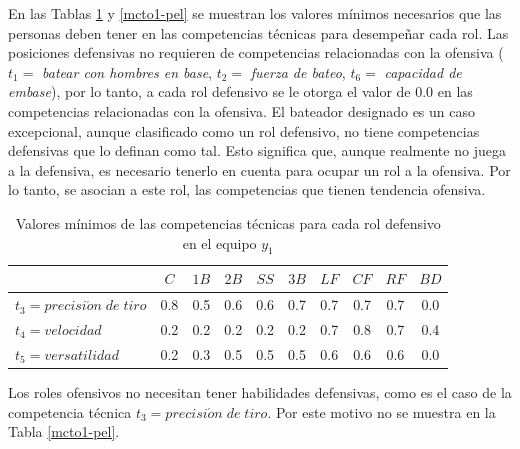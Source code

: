  
En las Tablas \ref{mctd1-pel} y \ref{mcto1-pel} se muestran los valores mínimos necesarios que las personas deben tener en las competencias técnicas para desempeñar cada rol. Las posiciones defensivas no requieren de competencias relacionadas con la ofensiva ($t_1=$ \textit{batear con hombres en base}, $t_2=$ \textit{fuerza de bateo}, $t_6=$ \textit{capacidad de embase}), por lo tanto, a cada rol defensivo se le otorga el valor de 0.0 en las competencias relacionadas con la ofensiva. El bateador designado es un caso excepcional, aunque clasificado como un rol defensivo, no tiene competencias defensivas que lo definan como tal. Esto significa que, aunque realmente no juega a la defensiva, es necesario tenerlo en cuenta para ocupar un rol a la ofensiva. Por lo tanto, se asocian a este rol, las competencias que tienen tendencia ofensiva.
\begin{table}[H]
	\centering
	\caption{Valores mínimos de las competencias técnicas para cada rol defensivo en el equipo $y_1$}\label{mctd1-pel}
	\begin{tabular}{|l|c|c|c|c|c|c|c|c|c|}
		\hline
		\thead{$Q(t,r,y)$} & $C$ & $1B$  & $2B$ & $SS$ & $3B$ & $LF$ & $CF$ & $RF$ & $BD$  \\ \hline
		$t_3=precisi\acute{o}n\;de\;tiro$ 		 & 0.8 &  0.5  &  0.6 & 0.6  & 0.7  & 0.7  & 0.7  &  0.7 & 0.0 \\ \hline
		$t_4=velocidad$ 		 & 0.2 &  0.2  &  0.2 & 0.2  & 0.2  & 0.7  & 0.8  &  0.7 &  0.4 \\ \hline
		$t_5=versatilidad$   	 & 0.2 &  0.3  &  0.5 & 0.5  & 0.5  & 0.6  & 0.6  &  0.6 & 0.0 \\ \hline
	\end{tabular}
\end{table}

Los roles ofensivos no necesitan tener habilidades defensivas, como es el caso de la competencia técnica $t_3=precisi\acute{o}n\;de\;tiro$. Por este motivo no se muestra en la Tabla \ref{mcto1-pel}.


